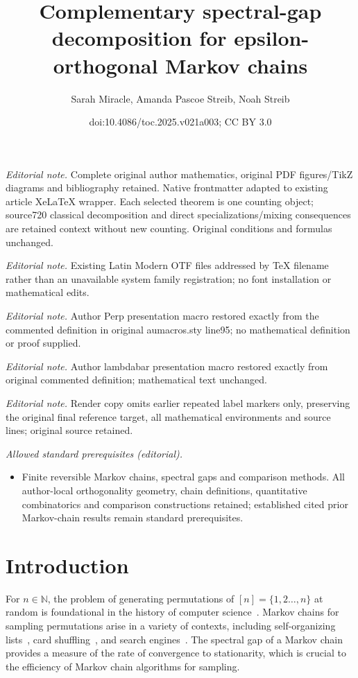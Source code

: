 \documentclass[11pt]{article}
\title{Complementary spectral-gap decomposition for epsilon-orthogonal Markov chains}
\author{Sarah Miracle, Amanda Pascoe Streib, Noah Streib}
\date{doi:10.4086/toc.2025.v021a003; CC BY 3.0}
\begin{document}
\maketitle
\noindent\textit{Editorial note.} Complete original author mathematics, original PDF figures/TikZ diagrams and bibliography retained. Native frontmatter adapted to existing article XeLaTeX wrapper. Each selected theorem is one counting object; source720 classical decomposition and direct specializations/mixing consequences are retained context without new counting. Original conditions and formulas unchanged.\par\medskip
\noindent\textit{Editorial note.} Existing Latin Modern OTF files addressed by TeX filename rather than an unavailable system family registration; no font installation or mathematical edits.\par\medskip
\noindent\textit{Editorial note.} Author Perp presentation macro restored exactly from the commented definition in original aumacros.sty line95; no mathematical definition or proof supplied.\par\medskip
\noindent\textit{Editorial note.} Author lambdabar presentation macro restored exactly from original commented definition; mathematical text unchanged.\par\medskip
\noindent\textit{Editorial note.} Render copy omits earlier repeated label markers only, preserving the original final reference target, all mathematical environments and source lines; original source retained.\par\medskip
\noindent\textit{Allowed standard prerequisites (editorial).}\begin{itemize}
\item Finite reversible Markov chains, spectral gaps and comparison methods. All author-local orthogonality geometry, chain definitions, quantitative combinatorics and comparison constructions retained; established cited prior Markov-chain results remain standard prerequisites.
\end{itemize}\medskip
\section{Introduction}\label{sec:intro}

For $n\in\mathbb{N}$, the problem of generating permutations of 
$[n]=\{1,2\dots,n\}$ at random is foundational in the history of 
computer science~\cite{knuth2}. Markov chains for sampling permutations 
arise in a variety of contexts, including self-organizing 
lists~\cite{selforganizingsurvey, rivest}, card shuffling~\cite{bd, 
wilson}, and search engines~\cite{search}. The spectral gap of a Markov 
chain provides a measure of the rate of convergence to stationarity, 
which is crucial to the efficiency of Markov chain algorithms for 
sampling.
\end{document}
